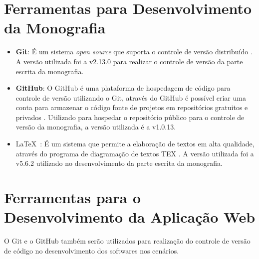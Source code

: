 \section{Ferramentas para Desenvolvimento da Monografia}
\label{sec:ferramentasDesenvolvimento}

\begin{itemize}
	
	\item \textbf{Git}: É um sistema \textit{open source} que suporta o controle de versão distribuído \cite{git}. A versão utilizada foi a v2.13.0 para realizar o controle de versão da parte escrita da monografia. 
	
	\item \textbf{GitHub}: O GitHub é uma plataforma de hospedagem de código para controle de versão utilizando o Git, através do GitHub é possível criar uma conta para armazenar o código fonte de projetos em repositórios gratuitos e privados \cite{github}. Utilizado para hospedar o repositório público para o controle de versão da monografia, a versão utilizada é a v1.0.13.
	
	\item \LaTeX\ : É um sistema que permite a elaboração de textos em alta qualidade, através do programa de diagramação de textos TEX \cite{latex}. A versão utilizada foi a v5.6.2 utilizado no desenvolvimento da parte escrita da monografia. 
	
\end{itemize}

\section{Ferramentas para o Desenvolvimento da Aplicação Web}
\label{sec:ferramentasParaDesenvolvimentoWebApp}

O Git e o GitHub também serão utilizados para realização do controle de versão de código no desenvolvimento dos softwares nos cenários.

